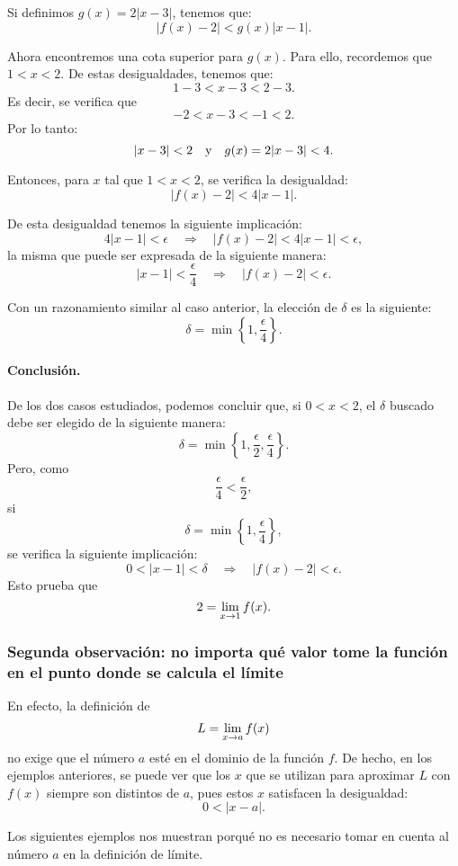 \begin{exemplo}[Solución]
Si definimos $g(x) = 2|x - 3|$, tenemos que:
\[
|f(x) - 2| < g(x)|x - 1|.
\]

Ahora encontremos una cota superior para $g(x)$. Para ello, recordemos que $1 < x < 2$. De estas
desigualdades, tenemos que:
\[
1 - 3 < x - 3 < 2 - 3.
\]
Es decir, se verifica que
\[
-2 < x - 3 < - 1 < 2.
\]
Por lo tanto:
\[
|x - 3| < 2 \yjc g(x) = 2|x - 3| < 4.
\]

Entonces, para $x$ tal que $1 < x < 2$, se verifica la desigualdad:
\[
|f(x) - 2| < 4|x - 1|.
\]

De esta desigualdad tenemos la siguiente implicación:
\[
	4|x-1|<\epsilon \quad \Rightarrow \quad |f(x)-2|< 4|x - 1| < \epsilon,
\]
la misma que puede ser expresada de la siguiente manera:
\[
	|x-1| < \frac{\epsilon}{4} \quad \Rightarrow \quad |f(x)-2| < \epsilon.
\]

Con un razonamiento similar al caso anterior, la elección de $\delta$ es la siguiente:
\begin{equation}
\label{eqLim052}
\delta = \min\left\{1,\frac{\epsilon}{4}\right\}.
\end{equation}

\paragraph{Conclusión.}
De los dos casos estudiados, podemos concluir que, si $0 < x < 2$, el $\delta$ buscado debe ser
elegido de la siguiente manera:
\[
\delta = \min\left\{1,\frac{\epsilon}{2}, \frac{\epsilon}{4}\right\}.
\]
Pero, como
\[
\frac{\epsilon}{4} < \frac{\epsilon}{2},
\]
si
\[
\delta = \min\left\{1,\frac{\epsilon}{4}\right\},
\]
se verifica la siguiente implicación:
\[
	0 < |x-1| < \delta \quad \Rightarrow \quad |f(x)-2| < \epsilon.
\]
Esto prueba que
\[
2 = \limjc{f(x)}{x}{1}.
\]
\end{exemplo}

\subsubsection{Segunda observación: no importa qué valor tome la función en el punto donde se calcula el límite} En
efecto, la definición de
\[
L = \limjc{f(x)}{x}{a}
\]
no exige que el número $a$ esté en el dominio de la función $f$. De hecho, en los ejemplos
anteriores, se puede ver que los $x$ que se utilizan para aproximar $L$ con $f(x)$ siempre son
distintos de $a$, pues estos $x$ satisfacen la desigualdad:
\[
0 < |x - a|.
\]

Los siguientes ejemplos nos muestran porqué no es necesario tomar en cuenta al número $a$ en la
definición de límite.

